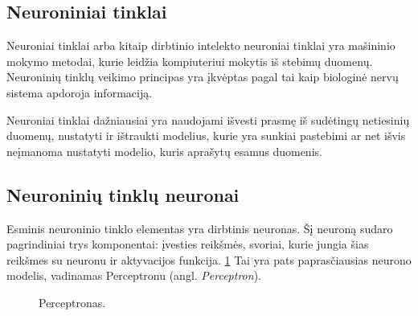 %
%

\subsection{Neuroniniai tinklai}
Neuroniai tinklai arba kitaip dirbtinio intelekto neuroniai tinklai yra mašininio mokymo metodai, kurie leidžia kompiuteriui mokytis iš stebimų duomenų. Neuroninių tinklų veikimo principas yra įkvėptas pagal tai kaip biologinė nervų sistema apdoroja informaciją.\cite{Sukhadeve2017}

Neuroniai tinklai dažniausiai yra naudojami išvesti prasmę iš sudėtingų netiesinių duomenų, nustatyti ir ištraukti modelius, kurie yra sunkiai pastebimi ar net išvis neįmanoma nustatyti modelio, kuris aprašytų esamus duomenis.\cite{Sukhadeve2017}



\subsection{Neuroninių tinklų neuronai}

Esminis neuroninio tinklo elementas yra dirbtinis neuronas. Šį neuroną sudaro pagrindiniai trys komponentai: įvesties reikšmės, svoriai, kurie jungia šias reikšmes su neuronu ir aktyvacijos funkcija. \ref{fig:perceptron1} Tai yra pats paprasčiausias neurono modelis, vadinamas Perceptronu (angl. \textit{Perceptron}).\cite{Andrew2017}

\begin{figure}[h!]
  \centering
{}
\caption{Perceptronas.}
\label{fig:perceptron1}
\end{figure}

